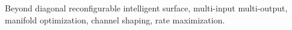 \documentclass[journal]{IEEEtran}
\begin{document}
\begin{abstract}


\end{abstract}

\begin{IEEEkeywords}
	Beyond diagonal reconfigurable intelligent surface, multi-input multi-output, manifold optimization, channel shaping, rate maximization.
\end{IEEEkeywords}

\glsresetall
\end{document}

